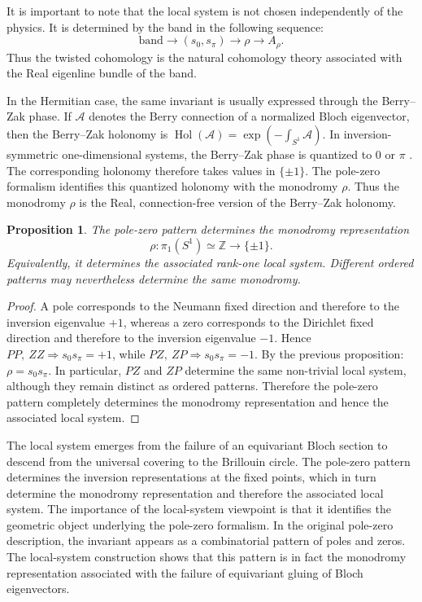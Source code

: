 \documentclass[preprint,12pt]{elsarticle}
\def\calA{{\mathcal A}}
\newtheorem{prop}{Proposition}
\newtheorem{proof}{Proof}
\begin{document}
It is important to note that the local system is not chosen independently of the physics. It is determined by the band in the following sequence:
$$
\text{band}
\longrightarrow
(s_0,s_\pi)
\longrightarrow
\rho
\longrightarrow
A_\rho.
$$
Thus the twisted cohomology is the natural cohomology theory associated with the Real eigenline bundle of the band.

In the Hermitian case, the same invariant is usually expressed through the Berry--Zak phase. If $\calA$ denotes the Berry connection of a normalized Bloch eigenvector, then the Berry--Zak holonomy is $\operatorname{Hol}(\calA)=\exp\left(-\int_{S^1}\calA\right)$.
In inversion-symmetric one-dimensional systems, the Berry--Zak phase is quantized to $0$ or $\pi$ \cite{kohn,zak}.
The corresponding holonomy therefore takes values in $\{\pm 1\}$. The pole-zero formalism identifies this
quantized holonomy with the monodromy $\rho$.
Thus the monodromy $\rho$ is the Real, connection-free version of the Berry--Zak holonomy.


\begin{prop}
The pole-zero pattern determines the monodromy representation
$$
\rho:\pi_1(S^1)\simeq\mathbb Z\to\{\pm1\}.
$$
Equivalently, it determines the associated rank-one local system.
Different ordered patterns may nevertheless determine the same monodromy.
\end{prop}
\begin{proof}
A pole corresponds to the Neumann fixed direction and therefore to the inversion eigenvalue $+1$, whereas a zero corresponds to the Dirichlet fixed direction and therefore to the inversion eigenvalue $-1$. Hence $PP,\ ZZ \Longrightarrow s_0s_\pi=+1$, while $PZ,\ ZP \Longrightarrow s_0s_\pi=-1$. By the previous proposition: $\rho=s_0s_\pi$. In particular, $PZ$ and $ZP$ determine the same non-trivial local system, although they remain distinct as ordered patterns. Therefore the pole-zero pattern completely determines the monodromy representation and hence the associated local system.
\end{proof}

The local system emerges from the failure of an equivariant Bloch section to descend from the universal covering to the Brillouin circle. The pole-zero pattern determines the inversion representations at the fixed points, which in turn determine the monodromy representation and therefore the associated local system. The importance of the local-system viewpoint is that it
identifies the geometric object underlying the pole-zero formalism. In the original pole-zero description, the invariant
appears as a combinatorial pattern of poles and zeros. The local-system construction shows that this pattern
is in fact the monodromy representation associated with the failure of equivariant gluing of Bloch eigenvectors.
\end{document}
